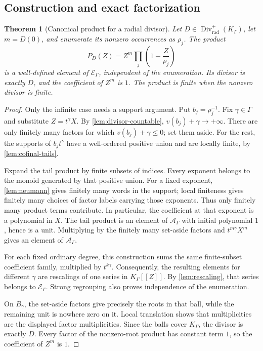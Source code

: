 \documentclass[11pt]{article}
\newtheorem{theorem}{Theorem}[section]
\theoremstyle{plain}
\theoremstyle{plain}
\theoremstyle{plain}
\theoremstyle{definition}
\theoremstyle{definition}
\theoremstyle{definition}
\theoremstyle{remark}
\newcommand{\K}{K_\Gamma}\newcommand{\E}{\mathcal E_\Gamma}
\newcommand{\A}{\mathcal A_\Gamma}\newcommand{\OO}{\mathcal O_\Gamma}
\DeclareMathOperator{\Div}{Div}\DeclareMathOperator{\inpol}{in}
\begin{document}
\subsection{Construction and exact factorization}
\begin{theorem}[Canonical product for a radial divisor]\label{thm:product}
Let $D\in\Div^+_{\mathrm{rad}}(\K)$, let $m=D(0)$, and enumerate its
nonzero occurrences as $\rho_j$. The product
\begin{equation}\label{eq:product}
 P_D(Z)=Z^m\prod_j\left(1-\frac Z{\rho_j}\right)
\end{equation}
is a well-defined element of $\E$, independent of the enumeration.
Its divisor is exactly $D$, and the coefficient of $Z^m$ is $1$.
The product is finite when the nonzero divisor is finite.
\end{theorem}
\begin{proof}
Only the infinite case needs a support argument. Put $b_j=\rho_j^{-1}$.
Fix $\gamma\in\Gamma$ and substitute $Z=t^\gamma X$. By
\cref{lem:divisor-countable}, $v(b_j)+\gamma\to+\infty$.
There are only finitely many factors for which $v(b_j)+\gamma\le0$;
set them aside. For the rest, the supports of $b_jt^\gamma$ have a
well-ordered positive union and are locally finite, by
\cref{lem:cofinal-tails}.

Expand the tail product by finite subsets of indices. Every exponent
belongs to the monoid generated by that positive union. For a fixed
exponent, \cref{lem:neumann} gives finitely many words in the support;
local finiteness gives finitely many choices of factor labels carrying
those exponents. Thus only finitely many product terms contribute.
In particular, the coefficient at that exponent is a polynomial in
$X$. The tail product is an element of $\A$ with initial polynomial
$1$, hence is a unit. Multiplying by the finitely many set-aside factors
and $t^{m\gamma}X^m$ gives an element of $\A$.

For each fixed ordinary degree, this construction sums the same
finite-subset coefficient family, multiplied by $t^{k\gamma}$.
Consequently, the resulting elements for different $\gamma$ are
rescalings of one series in $\K[[Z]]$. By \cref{lem:rescaling}, that
series belongs to $\E$. Strong regrouping also proves independence
of the enumeration.

On $B_\gamma$, the set-aside factors give precisely the roots in
that ball, while the remaining unit is nowhere zero on it. Local
translation shows that multiplicities are the displayed factor
multiplicities. Since the balls cover $\K$, the divisor is exactly
$D$. Every factor of the nonzero-root product has constant term $1$,
so the coefficient of $Z^m$ is $1$.
\end{proof}
\end{document}
